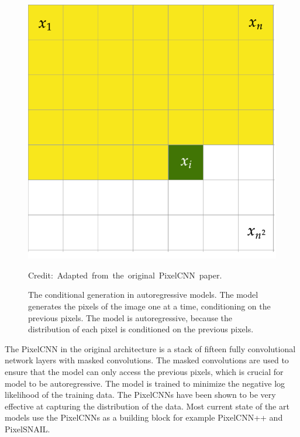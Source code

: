 \begin{figure}
    \centering 
    \includegraphics[scale=0.20]{figures/pixelcnn.png}
    \caption[The conditional generation in autoregressive models]%
    {The conditional generation in autoregressive models. The model generates the pixels of the image one at a time, conditioning on the previous pixels. The model is autoregressive, because the distribution of each pixel is conditioned on the previous pixels.}
  	\medskip 
    \hspace*{15pt}\hbox{\scriptsize Credit: Adapted from the original PixelCNN paper.\cite{pixelcnn}}\label{PixelCNNFigure}
\end{figure}

The PixelCNN in the original architecture is a stack of fifteen fully convolutional network layers with masked convolutions. The masked convolutions are used to ensure that the model can only access the previous pixels, which is crucial for model to be autoregressive. The model is trained to minimize the negative log likelihood of the training data. The PixelCNNs have been shown to be very effective at capturing the distribution of the data. Most current state of the art models use the PixelCNNs as a building block for example PixelCNN++ and PixelSNAIL.\cite{pixelcnn, pixelcnnpp,pixelsnail}

